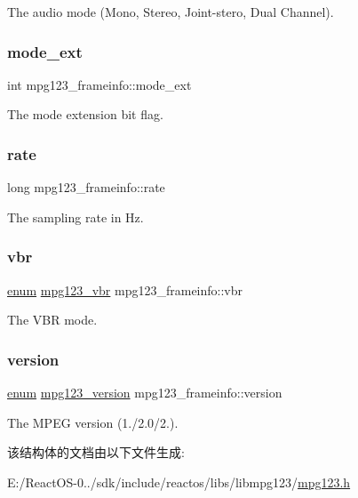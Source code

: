 The audio mode (Mono, Stereo, Joint-\/stero, Dual Channel). \mbox{\label{structmpg123__frameinfo_ad9c559387cf061d05384b4c204cd0e97}} 
\subsubsection{\texorpdfstring{mode\+\_\+ext}{mode\_ext}}
{\footnotesize\ttfamily int mpg123\+\_\+frameinfo\+::mode\+\_\+ext}

The mode extension bit flag. \mbox{\label{structmpg123__frameinfo_ab0e716a76ae87991e4607e5803da6899}} 
\subsubsection{\texorpdfstring{rate}{rate}}
{\footnotesize\ttfamily long mpg123\+\_\+frameinfo\+::rate}

The sampling rate in Hz. \mbox{\label{structmpg123__frameinfo_a48708817882f58b0a32c1e9db6e9fd74}} 
\subsubsection{\texorpdfstring{vbr}{vbr}}
{\footnotesize\ttfamily \hyperlink{interfaceenum}{enum} \hyperlink{group__mpg123__status_ga8253714e77705037271f377f33858876}{mpg123\+\_\+vbr} mpg123\+\_\+frameinfo\+::vbr}

The V\+BR mode. \mbox{\label{structmpg123__frameinfo_aa1276e21b0fd007148ac85b6290de057}} 
\subsubsection{\texorpdfstring{version}{version}}
{\footnotesize\ttfamily \hyperlink{interfaceenum}{enum} \hyperlink{group__mpg123__status_ga0553c78534d6d130df2d1dc0df675748}{mpg123\+\_\+version} mpg123\+\_\+frameinfo\+::version}

The M\+P\+EG version (1./2.0/2.). 

该结构体的文档由以下文件生成\+:\begin{DoxyCompactItemize}
\item 
E\+:/\+React\+O\+S-\/0../sdk/include/reactos/libs/libmpg123/\hyperlink{mpg123_8h}{mpg123.\+h}\end{DoxyCompactItemize}
